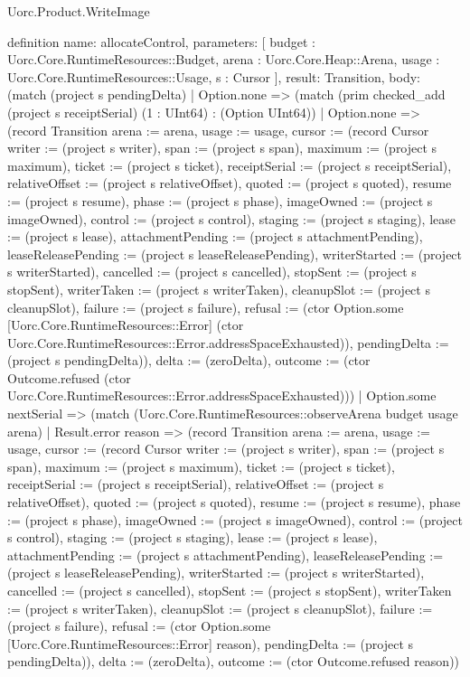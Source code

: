 \begin{lexlean}{Uorc.Product.WriteImage}
\begin{semanticmodule}
definition{
  name: allocateControl,
  parameters: [
    budget : Uorc.Core.RuntimeResources::Budget,
    arena : Uorc.Core.Heap::Arena,
    usage : Uorc.Core.RuntimeResources::Usage,
    s : Cursor
  ],
  result: Transition,
  body: (match (project s pendingDelta)
    | Option.none => (match (prim checked_add (project s receiptSerial) (1 : UInt64) : (Option UInt64))
      | Option.none => (record Transition {arena := arena, usage := usage, cursor := (record Cursor {writer := (project s writer), span := (project s span), maximum := (project s maximum), ticket := (project s ticket), receiptSerial := (project s receiptSerial), relativeOffset := (project s relativeOffset), quoted := (project s quoted), resume := (project s resume), phase := (project s phase), imageOwned := (project s imageOwned), control := (project s control), staging := (project s staging), lease := (project s lease), attachmentPending := (project s attachmentPending), leaseReleasePending := (project s leaseReleasePending), writerStarted := (project s writerStarted), cancelled := (project s cancelled), stopSent := (project s stopSent), writerTaken := (project s writerTaken), cleanupSlot := (project s cleanupSlot), failure := (project s failure), refusal := (ctor Option.some [Uorc.Core.RuntimeResources::Error] (ctor Uorc.Core.RuntimeResources::Error.addressSpaceExhausted)), pendingDelta := (project s pendingDelta)}), delta := (zeroDelta), outcome := (ctor Outcome.refused (ctor Uorc.Core.RuntimeResources::Error.addressSpaceExhausted))})
      | Option.some nextSerial => (match (Uorc.Core.RuntimeResources::observeArena budget usage arena)
        | Result.error reason => (record Transition {arena := arena, usage := usage, cursor := (record Cursor {writer := (project s writer), span := (project s span), maximum := (project s maximum), ticket := (project s ticket), receiptSerial := (project s receiptSerial), relativeOffset := (project s relativeOffset), quoted := (project s quoted), resume := (project s resume), phase := (project s phase), imageOwned := (project s imageOwned), control := (project s control), staging := (project s staging), lease := (project s lease), attachmentPending := (project s attachmentPending), leaseReleasePending := (project s leaseReleasePending), writerStarted := (project s writerStarted), cancelled := (project s cancelled), stopSent := (project s stopSent), writerTaken := (project s writerTaken), cleanupSlot := (project s cleanupSlot), failure := (project s failure), refusal := (ctor Option.some [Uorc.Core.RuntimeResources::Error] reason), pendingDelta := (project s pendingDelta)}), delta := (zeroDelta), outcome := (ctor Outcome.refused reason)})
}
\end{semanticmodule}
\end{lexlean}
